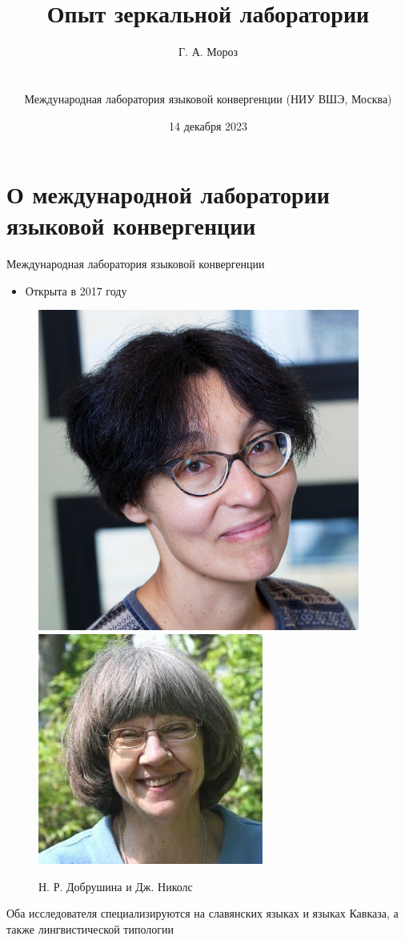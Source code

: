 \documentclass[
  ignorenonframetext,
]{beamer}
\title{Опыт зеркальной лаборатории}
\author{Г. А. Мороз\\
\strut \\
\small  Международная лаборатория языковой конвергенции (НИУ ВШЭ,
Москва)}
\date{14 декабря 2023}
\providecommand{\tightlist}{%
  \setlength{\itemsep}{0pt}\setlength{\parskip}{0pt}}
\begin{document}
\frame{\titlepage}

\hypertarget{ux43e-ux43cux435ux436ux434ux443ux43dux430ux440ux43eux434ux43dux43eux439-ux43bux430ux431ux43eux440ux430ux442ux43eux440ux438ux438-ux44fux437ux44bux43aux43eux432ux43eux439-ux43aux43eux43dux432ux435ux440ux433ux435ux43dux446ux438ux438}{%
\section{О международной лаборатории языковой
конвергенции}\label{ux43e-ux43cux435ux436ux434ux443ux43dux430ux440ux43eux434ux43dux43eux439-ux43bux430ux431ux43eux440ux430ux442ux43eux440ux438ux438-ux44fux437ux44bux43aux43eux432ux43eux439-ux43aux43eux43dux432ux435ux440ux433ux435ux43dux446ux438ux438}}

\begin{frame}{Международная лаборатория языковой конвергенции}
\protect\hypertarget{ux43cux435ux436ux434ux443ux43dux430ux440ux43eux434ux43dux430ux44f-ux43bux430ux431ux43eux440ux430ux442ux43eux440ux438ux44f-ux44fux437ux44bux43aux43eux432ux43eux439-ux43aux43eux43dux432ux435ux440ux433ux435ux43dux446ux438ux438}{}
\begin{itemize}
\tightlist
\item
  Открыта в 2017 году
\end{itemize}

\begin{figure}

{\centering \includegraphics[width=0.4\linewidth]{images/01_dobrushina} \includegraphics[width=0.4\linewidth]{images/02_nichols} 

}

\caption{Н. Р. Добрушина и Дж. Николс}\label{fig:unnamed-chunk-2}
\end{figure}

Оба исследователя специализируются на славянских языках и языках
Кавказа, а также лингвистической типологии
\end{frame}
\end{document}
